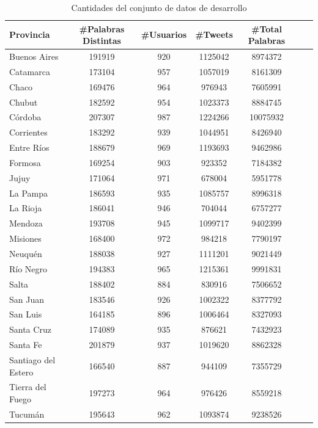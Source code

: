 \begin{table}[ht]
\centering

\label{tab:cantidades}
\begin{tabular}[width=0.7\textwidth]{|l|c|c|c|c|c|c|}
\hline
Provincia      & \#Palabras Distintas & \#Usuarios & \#Tweets & \#Total Palabras \\ \hline
Buenos Aires   & 191919       & 920          & 1125042    & 8974372  \\
Catamarca      & 173104       & 957          & 1057019    & 8161309   \\
Chaco          & 169476       & 964          & 976943     & 7605991   \\
Chubut         & 182592       & 954          & 1023373    & 8884745   \\
Córdoba        & 207307       & 987          & 1224266    & 10075932  \\
Corrientes     & 183292       & 939          & 1044951    & 8426940   \\
Entre Ríos     & 188679       & 969          & 1193693    & 9462986  \\
Formosa        & 169254       & 903          & 923352     & 7184382   \\
Jujuy          & 171064       & 971          & 678004     & 5951778   \\
La Pampa       & 186593       & 935          & 1085757    & 8996318  \\
La Rioja       & 186041       & 946          & 704044     & 6757277  \\
Mendoza        & 193708       & 945          & 1099717    & 9402399   \\
Misiones       & 168400       & 972          & 984218     & 7790197   \\
Neuquén        & 188038       & 927          & 1111201    & 9021449   \\
Río Negro      & 194383       & 965          & 1215361    & 9991831  \\
Salta          & 188402       & 884          & 830916     & 7506652   \\
San Juan       & 183546       & 926          & 1002322    & 8377792  \\
San Luis       & 164185       & 896          & 1006464    & 8327093  \\
Santa Cruz     & 174089       & 935          & 876621     & 7432923  \\
Santa Fe       & 201879       & 937          & 1019620    & 8862328  \\
Santiago del Estero       & 166540       & 887          & 944109     & 7355729  \\
Tierra del Fuego & 197273       & 964          & 976426     & 8559218   \\
Tucumán        & 195643       & 962          & 1093874    & 9238526 \\
  \hline
\end{tabular}
\caption{Cantidades del conjunto de datos de desarrollo}
\end{table}



